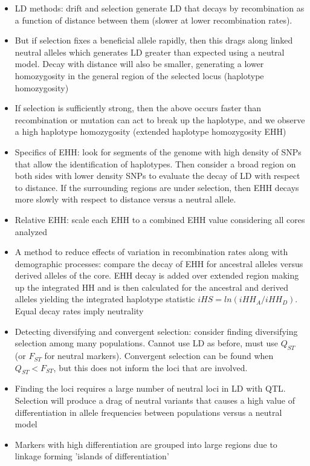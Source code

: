 \documentclass[12pt]{amsart}
\begin{document}
\begin{itemize}
\item LD methods: drift and selection generate LD that decays by recombination as a function of distance between them (slower at lower recombination rates).
\item But if selection fixes a beneficial allele rapidly, then this drags along linked neutral alleles which generates LD greater than expected using a neutral model. Decay with distance will also be smaller, generating a lower homozygosity in the general region of the selected locus (haplotype homozygosity)
\item If selection is sufficiently strong, then the above occurs faster than recombination or mutation can act to break up the haplotype, and we observe a high haplotype homozygosity (extended haplotype homozygosity EHH)
\item Specifics of EHH: look for segments of the genome with high density of SNPs that allow the identification of haplotypes. Then consider a broad region on both sides with lower density SNPs to evaluate the decay of LD with respect to distance. If the surrounding regions are under selection, then EHH decays more slowly with respect to distance versus a neutral allele.
\item Relative EHH: scale each EHH to a combined EHH value considering all cores analyzed
\item A method to reduce effects of variation in recombination rates along with demographic processes: compare the decay of EHH for ancestral alleles versus derived alleles of the core. EHH decay is added over extended region making up the integrated HH and is then calculated for the ancestral and derived alleles yielding the integrated haplotype statistic $iHS = ln(iHH_A/iHH_D)$. Equal decay rates imply neutrality 
\item Detecting diversifying and convergent selection: consider finding diversifying selection among many populations. Cannot use LD as before, must use $Q_{ST}$ (or $F_{ST}$ for neutral markers). Convergent selection can be found when $Q_{ST} < F_{ST}$, but this does not inform the loci that are involved.
\item Finding the loci requires a large number of neutral loci in LD with QTL. Selection will produce a drag of neutral variants that causes a high value of differentiation in allele frequencies between populations versus a neutral model 
\item Markers with high differentiation are grouped into large regions due to linkage forming 'islands of differentiation' 

\end{itemize}
\end{document}
